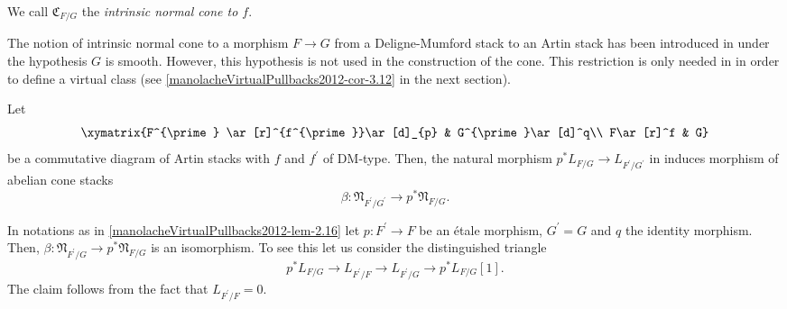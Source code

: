\begin{definition}\label{manolacheVirtualPullbacks2012-def-2.14}
\label{manolacheVirtualPullbacks2012-befa}We call $\mathfrak{C}_{F/G}$ the \emph{intrinsic normal cone to $f$}.
\end{definition}

\begin{remark}\label{manolacheVirtualPullbacks2012-rem-2.15}
 The notion of intrinsic normal cone to a morphism $F\to G$ from a Deligne-Mumford stack to an Artin stack has been introduced in \cite{bf} under the hypothesis $G$ is smooth. However, this hypothesis is not used in the construction of the cone. This restriction is only needed in \cite{bf} in order to define a virtual class (see \ref{manolacheVirtualPullbacks2012-cor-3.12} in the next section).
\end{remark}

\begin{lemma}\label{manolacheVirtualPullbacks2012-lem-2.16}
\label{manolacheVirtualPullbacks2012-seqcones}
 Let \begin{equation*}
 \xymatrix {F^{\prime} \ar[r]^{f^{\prime}}\ar[d]_{p} & G^{\prime}\ar[d]^q\\
             F\ar[r]^f & G}
\end{equation*}
be a commutative diagram of Artin stacks with $f$ and $f^{\prime}$ of DM-type. Then, the natural morphism $p^*L_{F/G}\to L_{F^{\prime}/G^{\prime}}$ in \cite{ol} induces morphism of abelian cone stacks $$\beta:\mathfrak{N}_{F^{\prime}/G^{\prime}}\rightarrow p^*\mathfrak{N}_{F/G}.$$
\end{lemma}

\begin{remark}\label{manolacheVirtualPullbacks2012-rem-2.17}
\label{manolacheVirtualPullbacks2012-etale} In notations as in \ref{manolacheVirtualPullbacks2012-lem-2.16} let $p:F^{\prime}\to F$ be an \'etale morphism, $G^{\prime}=G$ and $q$ the identity morphism. Then, $\beta:\mathfrak{N}_{F^{\prime}/G}\rightarrow p^*\mathfrak{N}_{F/G}$ is an isomorphism. To see this let us consider the distinguished triangle $$p^*L_{F/G}\to L_{F^{\prime}/F}\to L_{F^{\prime}/G}\to p^*L_{F/G}[1].$$ The claim follows from the fact that $L_{F^{\prime}/F}=0$.
\end{remark}

